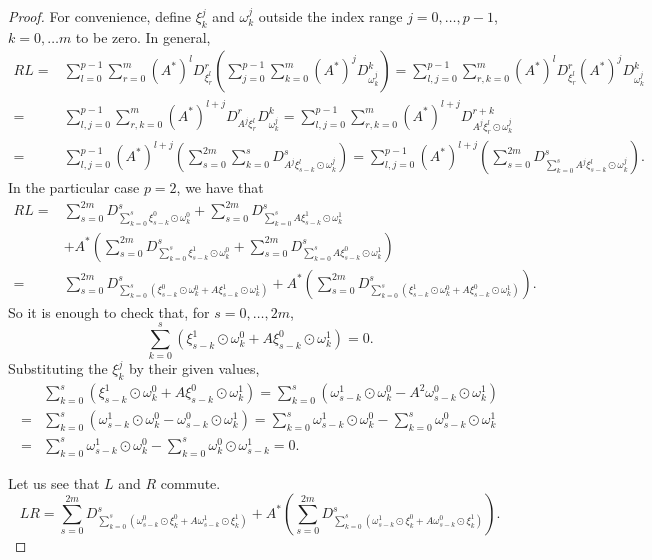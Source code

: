 \documentclass[a4paper,12pt,onecolumn]{article}
\theoremstyle{ptheorem}
\theoremstyle{hdef}
\theoremstyle{premark}
\numberwithin{equation}{section}
\numberwithin{figure}{section}
\newcommand{\<}{\langle}
\renewcommand{\>}{\rangle}
\renewcommand{\<}{\left<}
\renewcommand{\>}{\right>}
\renewcommand{\(}{\left(}
\renewcommand{\)}{\right)}
\begin{document}
\begin{proof} For convenience, define $\xi^j_k$ and $\omega^j_k$ outside the index range $j=0,\dots,p-1$, $k=0,\dots m$ to be zero. In general,
	\begin{align*}
		RL= & \sum_{l=0}^{p-1}\sum_{r=0}^m(A^*)^lD^r_{\xi^l_r}\left(\sum_{j=0}^{p-1}\sum_{k=0}^m(A^*)^jD^k_{\omega^j_k}\right)=\sum_{l,j=0}^{p-1}\sum_{r,k=0}^m(A^*)^lD^r_{\xi^l_r}(A^*)^jD^k_{\omega^j_k} \\ = & \sum_{l,j=0}^{p-1}\sum_{r,k=0}^m(A^*)^{l+j}D^r_{A^j\xi^l_r}D^k_{\omega^j_k}
		= \sum_{l,j=0}^{p-1}\sum_{r,k=0}^m(A^*)^{l+j}D^{r+k}_{A^j\xi^l_r\odot\omega^j_k}\\= &  \sum_{l,j=0}^{p-1}(A^*)^{l+j}\(\sum_{s=0}^{2m}\sum_{k=0}^sD^{s}_{A^j\xi^l_{s-k}\odot\omega^j_k}\)=\sum_{l,j=0}^{p-1}(A^*)^{l+j}\(\sum_{s=0}^{2m}D^{s}_{\sum_{k=0}^sA^j\xi^l_{s-k}\odot\omega^j_k}\).
	\end{align*}
In the particular case $p=2$, we have that
\begin{align*}
	RL= & \sum_{s=0}^{2m}D^{s}_{\sum_{k=0}^s\xi^0_{s-k}\odot\omega^0_k}+ \sum_{s=0}^{2m}D^{s}_{\sum_{k=0}^sA\xi^1_{s-k}\odot\omega^1_k} \\ & + A^*\(\sum_{s=0}^{2m}D^{s}_{\sum_{k=0}^s\xi^1_{s-k}\odot\omega^0_k}+ \sum_{s=0}^{2m}D^{s}_{\sum_{k=0}^sA\xi^0_{s-k}\odot\omega^1_k}\)\\
	= & \sum_{s=0}^{2m}D^{s}_{\sum_{k=0}^s\(\xi^0_{s-k}\odot\omega^0_k+A\xi^1_{s-k}\odot\omega^1_k\)}+ A^*\(\sum_{s=0}^{2m}D^{s}_{\sum_{k=0}^s\(\xi^1_{s-k}\odot\omega^0_k+A\xi^0_{s-k}\odot\omega^1_k\)}\).
\end{align*}
So it is enough to check that, for $s=0,\dots,2m$,
\[\sum_{k=0}^s\(\xi^1_{s-k}\odot\omega^0_k+A\xi^0_{s-k}\odot\omega^1_k\)=0.\]
Substituting the $\xi_k^j$ by their given values,
\begin{align*}& \sum_{k=0}^s\(\xi^1_{s-k}\odot\omega^0_k+A\xi^0_{s-k}\odot\omega^1_k\) =   \sum_{k=0}^s\(\omega^1_{s-k}\odot\omega^0_k-A^2\omega^0_{s-k}\odot\omega^1_k\) \\ = & \sum_{k=0}^s\(\omega^1_{s-k}\odot\omega^0_k-\omega^0_{s-k}\odot\omega^1_k\) = \sum_{k=0}^s\omega^1_{s-k}\odot\omega^0_k-\sum_{k=0}^s\omega^0_{s-k}\odot\omega^1_k \\ = & \sum_{k=0}^s\omega^1_{s-k}\odot\omega^0_k-\sum_{k=0}^s\omega^0_{k}\odot\omega^1_{s-k}=0.
\end{align*}
\par
Let us see that $L$ and $R$ commute.
\[
LR=  \sum_{s=0}^{2m}D^{s}_{\sum_{k=0}^s\(\omega^0_{s-k}\odot\xi^0_k+A\omega^1_{s-k}\odot\xi^1_k\)}+ A^*\(\sum_{s=0}^{2m}D^{s}_{\sum_{k=0}^s\(\omega^1_{s-k}\odot\xi^0_k+A\omega^0_{s-k}\odot\xi^1_k\)}\).\]

\end{proof}
\end{document}
